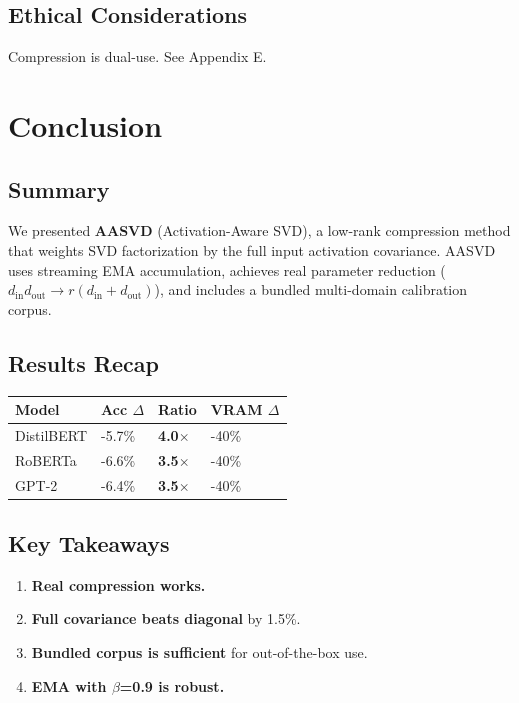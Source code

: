 \subsection{Ethical Considerations}

Compression is dual-use. See Appendix E.


\section{Conclusion}

\subsection{Summary}

We presented \textbf{AASVD} (Activation-Aware SVD), a low-rank compression method 
that weights SVD factorization by the full input activation covariance. AASVD 
uses streaming EMA accumulation, achieves real parameter reduction 
($d_\text{in} d_\text{out} \to r(d_\text{in} + d_\text{out})$), and includes 
a bundled multi-domain calibration corpus.

\subsection{Results Recap}

\begin{table}[H]
\centering
\small
\begin{tabular}{llll}
\toprule
\textbf{Model} & \textbf{Acc $\Delta$} & \textbf{Ratio} & \textbf{VRAM $\Delta$} \\
\midrule
DistilBERT & -5.7\% & \textbf{4.0$\times$} & -40\% \\
RoBERTa & -6.6\% & \textbf{3.5$\times$} & -40\% \\
GPT-2 & -6.4\% & \textbf{3.5$\times$} & -40\% \\
\bottomrule
\end{tabular}
\end{table}

\subsection{Key Takeaways}

\begin{enumerate}
\item \textbf{Real compression works.}
\item \textbf{Full covariance beats diagonal} by 1.5\%.
\item \textbf{Bundled corpus is sufficient} for out-of-the-box use.
\item \textbf{EMA with $\beta$=0.9 is robust.}

\end{enumerate}
